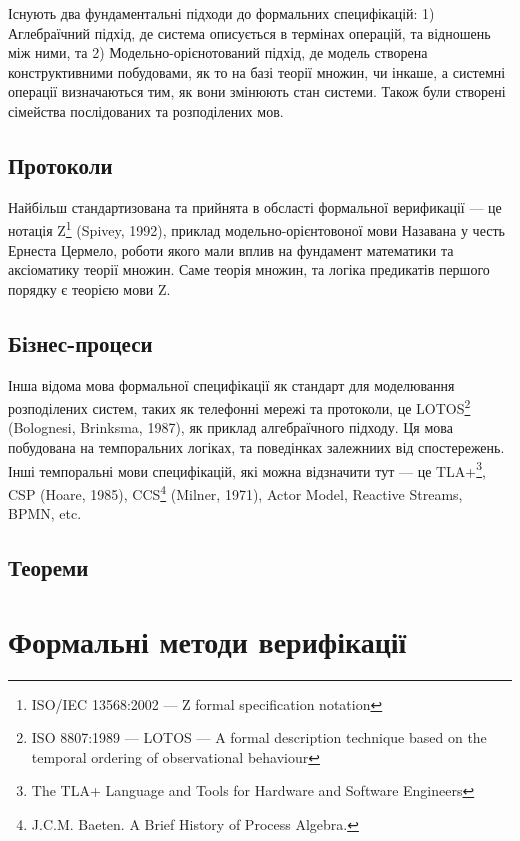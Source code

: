 Існують два фундаментальні підходи до формальних специфікацій: 1) Аглебраїчний підхід, де
система описується в термінах операцій, та відношень між ними, та
2) Модельно-орієнотований підхід, де модель створена конструктивними побудовами,
як то на базі теорії множин, чи інкаше, а системні операції визначаються тим, як вони змінюють
стан системи. Також були створені сімейства послідованих та розподілених мов.

\subsection{Протоколи}

Найбільш стандартизована та прийнята в обсласті формальної верификації --- це нотація
Z\footnote{ISO/IEC 13568:2002 --- Z formal specification notation} (Spivey, 1992), приклад
модельно-орієнтовоної мови
Назавана у честь Ернеста Цермело, роботи якого мали вплив на фундамент математики та аксіоматику
теорії множин. Саме теорія множин, та логіка предикатів першого порядку є теорією мови Z.

\subsection{Бізнес-процеси}

Інша відома мова формальної специфікації як стандарт для моделювання розподілених систем,
таких як телефонні мережі та протоколи, це
LOTOS\footnote{ISO 8807:1989 --- LOTOS --- A formal description technique based
on the temporal ordering of observational behaviour} (Bolognesi, Brinksma, 1987), як приклад алгебраїчного підходу.
Ця мова побудована на темпоральних логіках, та поведінках залежниих від спостережень.
Інші темпоральні мови специфікацій, які можна відзначити тут --- це TLA+\footnote{The
TLA+ Language and Tools for Hardware and Software Engineers}, CSP (Hoare, 1985),
CCS\footnote{J.C.M. Baeten. A Brief History of Process Algebra.} (Milner, 1971), Actor Model, Reactive Streams, BPMN, etc.

\subsection{Теореми}

\section{Формальні методи верифікації}

